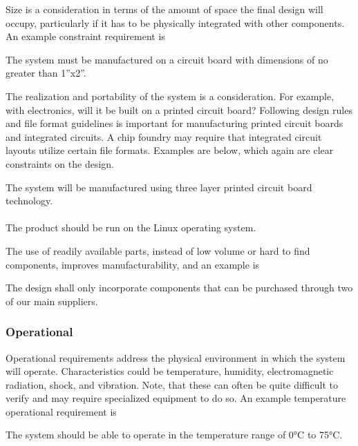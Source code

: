 Size is a consideration in terms of the amount of space the final design
will occupy, particularly if it has to be physically integrated with
other components. An example constraint requirement is

\begin{itquote}
The system must be manufactured on a circuit board with dimensions of no
greater than 1''x2''.
\end{itquote}

The realization and portability of the system is a consideration. For
example, with electronics, will it be built on a printed circuit board?
Following design rules and file format guidelines is important for
manufacturing printed circuit boards and integrated circuits. A chip
foundry may require that integrated circuit layouts utilize certain file
formats. Examples are below, which again are clear constraints on the
design.

\begin{itquote}
The system will be manufactured using three layer printed circuit board
technology.\\ \\
The product should be run on the Linux operating system.
\end{itquote}

The use of readily available parts, instead of low volume or hard to
find components, improves manufacturability, and an example is

\begin{itquote}
The design shall only incorporate components that can be purchased
through two of our main suppliers.
\end{itquote}

\subsubsection*{Operational}
\label{subsection:operational}

Operational requirements address the physical environment in which the
system will operate. Characteristics could be temperature, humidity,
electromagnetic radiation, shock, and vibration. Note, that these can
often be quite difficult to verify and may require specialized equipment
to do so. An example temperature operational requirement is

\begin{itquote}
The system should be able to operate in the temperature range of 0°C to
75°C.
\end{itquote}

